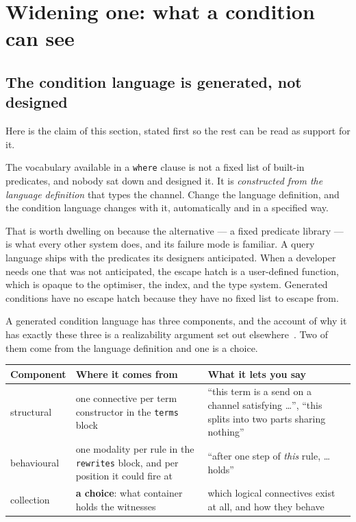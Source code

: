 \section{Widening one: what a condition can see}
\label{sec:logic}

\subsection{The condition language is generated, not designed}

Here is the claim of this section, stated first so the rest can be read as
support for it.

The vocabulary available in a \texttt{where} clause is not a fixed list of
built-in predicates, and nobody sat down and designed it. It is
\emph{constructed from the language definition} that types the channel. Change
the language definition, and the condition language changes with it,
automatically and in a specified way.

That is worth dwelling on because the alternative --- a fixed predicate library
--- is what every other system does, and its failure mode is familiar. A query
language ships with the predicates its designers anticipated. When a developer
needs one that was not anticipated, the escape hatch is a user-defined function,
which is opaque to the optimiser, the index, and the type system. Generated
conditions have no escape hatch because they have no fixed list to escape from.

A generated condition language has three components, and the account of why it
has exactly these three is a realizability argument set out
elsewhere~\cite{Zeus}. Two of them come from the language definition and one is
a choice.

\begin{center}
\small
\begin{tabular}{@{}L{0.22\textwidth}L{0.30\textwidth}L{0.40\textwidth}@{}}
\toprule
\textbf{Component} & \textbf{Where it comes from} & \textbf{What it lets you say} \\
\midrule
structural & one connective per term
constructor in the \texttt{terms} block & ``this term is a send on a channel
satisfying \dots'', ``this splits into two parts sharing nothing'' \\[3pt]
behavioural & one modality per rule in the
\texttt{rewrites} block, and per position it could fire at & ``after one step of
\emph{this} rule, \dots holds'' \\[3pt]
collection & \textbf{a choice}: what
container holds the witnesses & which logical connectives exist at all, and how
they behave \\
\bottomrule
\end{tabular}
\end{center}

